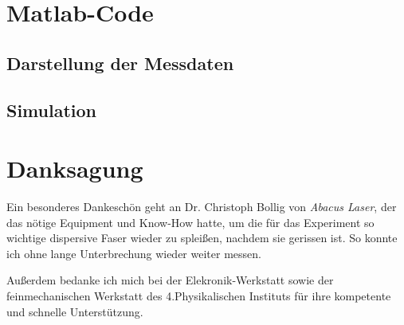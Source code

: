 \documentclass[bachelor,       %
               twoside,        %
               BCOR10mm,       %
               english,ngerman, %
               ]{GAUBM}
\begin{document}
\chapter{Matlab-Code}
\section{Darstellung der Messdaten}

\section{Simulation}


\cleardoublepage
 

\chapter*{Danksagung}
Ein besonderes Dankeschön geht an Dr. Christoph Bollig von \textit{Abacus Laser}, der das nötige Equipment und Know-How hatte, um die für das Experiment so wichtige dispersive Faser wieder zu spleißen, nachdem sie gerissen ist.
So konnte ich ohne lange Unterbrechung wieder weiter messen.

Außerdem bedanke ich mich bei der Elekronik-Werkstatt sowie der feinmechanischen Werkstatt des 4.Physikalischen Instituts für ihre kompetente und schnelle Unterstützung.

\Declaration
\end{document}
